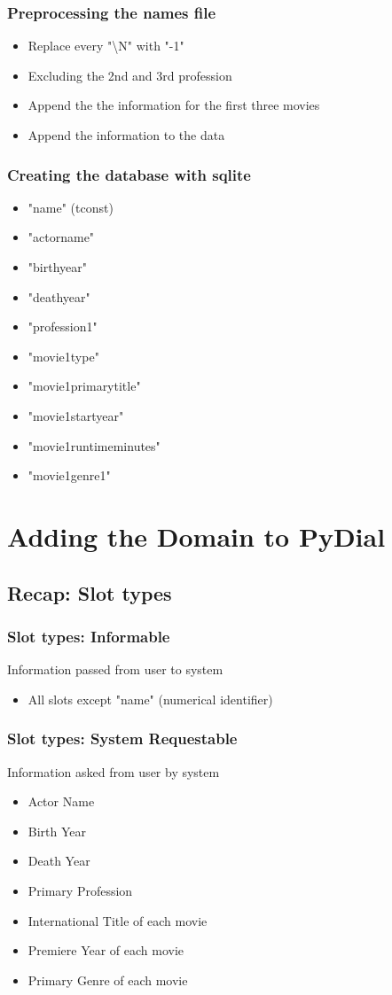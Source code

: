\documentclass[11pt]{beamer}
\begin{document}
	\begin{frame}
		\frametitle{Preprocessing the names file}
		\begin{itemize}
			\item Replace every "\textbackslash N" with "-1" \pause
			\item Excluding the 2nd and 3rd profession \pause
			\item Append the the information for the first three movies \pause
			\item Append the information to the data
		\end{itemize}
	\end{frame}

	\begin{frame}
		\frametitle{Creating the database with sqlite}
		\begin{itemize}
			\item "name" (tconst) \pause
			\item "actorname" \pause
			\item "birthyear" \pause
			\item "deathyear" \pause
			\item "profession1" \pause
		    \item "movie1type" \pause
			\item "movie1primarytitle" \pause
			\item "movie1startyear" \pause
			\item "movie1runtimeminutes" \pause
			\item "movie1genre1"
		\end{itemize}
	\end{frame}

\section{Adding the Domain to PyDial}
	\subsection{Recap: Slot types}
	\begin{frame}
		\frametitle{Slot types: Informable}
		Information passed from user to system \pause		
		\begin{itemize}
			\item All slots except "name" (numerical identifier)
		\end{itemize}
	\end{frame}
	
	\begin{frame}
		\frametitle{Slot types: System Requestable}
		Information asked from user by system \pause
		\begin{itemize}
			\item Actor Name
			\item Birth Year
			\item Death Year
			\item Primary Profession
			\item International Title of each movie
			\item Premiere Year of each movie
			\item Primary Genre of each movie
		\end{itemize}
	\end{frame}
		
\end{document}
